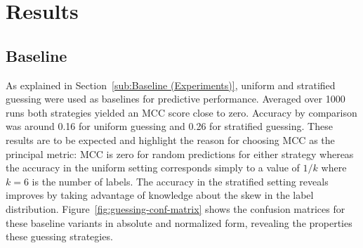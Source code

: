 


\clearpage

\section{Results}
\label{sec:Results}

\subsection{Baseline}
\label{sub:Baseline (Results)}

As explained in Section~\ref{sub:Baseline (Experiments)}, uniform and stratified guessing were used as baselines for predictive performance. Averaged over 1000 runs both strategies yielded an \gls{MCC} score close to zero. Accuracy by comparison was around 0.16 for uniform guessing and 0.26 for stratified guessing. These results are to be expected and highlight the reason for choosing \gls{MCC} as the principal metric: \gls{MCC} is zero for random predictions for either strategy whereas the accuracy in the uniform setting corresponds simply to a value of $1/k$ where $k = 6$ is the number of labels. The accuracy in the stratified setting reveals improves by taking advantage of knowledge about the skew in the label distribution. Figure~\ref{fig:guessing-conf-matrix} shows the confusion matrices for these baseline variants in absolute and normalized form, revealing the properties these guessing strategies.


